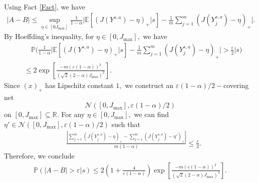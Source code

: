 \documentclass[12pt,technote,onecolumn]{IEEEtran}
\begin{document}
\begin{IEEEproof}
\begin{enumerate}
\begin{equation*}
\begin{aligned}
		\end{aligned}
		\end{equation*}
		Using Fact \ref{Fact}, we have
		\begin{equation*}
		\begin{aligned}
		\left|A-B\right|
		\leq\sup_{\eta\in\left[0J_{\max}\right]}\frac{1}{1-\alpha}\bigg|\mathbb{E}\left[\left(J\left(Y^{s,a}\right)-\eta\right)_{+}|s\right]
		-\frac{1}{m}\sum_{j=1}^{m}\left(J\left(Y_{j}^{s,a}\right)-\eta\right)_{+}\bigg|.
		\end{aligned}
		\end{equation*}
		By Hoeffding's inequality, for $\eta\in\left[0,J_{\max}\right],$
		we have	
		\begin{equation*}
		\begin{aligned}
			&\quad \mathbb{P}\bigg(\frac{1}{1-\alpha}\bigg|\mathbb{E}\left[\left(J\left(Y^{s,a}\right)-\eta\right)_{+}|s\right]
			-\frac{1}{m}\sum_{j=1}^{m}\left(J\left(Y_{j}^{s,a}\right)-\eta\right)_{+}\bigg|>\frac{\varepsilon}{2}|s\bigg)\\
			& \leq  2\exp\left[\frac{-m\left(\varepsilon\left(1-\alpha\right)\right)^{2}}{\left(\sqrt{2}\left(2-\alpha\right)J_{\max}\right)^{2}}\right].
		\end{aligned}
		\end{equation*}
		Since $\left(x\right)_{+}$ has Lipschitz constant $1,$ we construct
		an $\varepsilon\left(1-\alpha\right)/2-$covering net $$\mathcal{N}\left(\left[0,J_{\max}\right],\varepsilon\left(1-\alpha\right)/2\right)$$
		on $\left[0,J_{\max}\right]\subseteq\mathbb{R}$. For any $\eta\in\left[0,J_{\max}\right],$
		we can find $\eta'\in\mathcal{N}\left(\left[0,J_{\max}\right],\varepsilon\left(1-\alpha\right)/2\right)$
		such that
		\begin{equation*}
		\begin{aligned}
		\quad\frac{\left|\sum_{j=1}^{m}\left(J\left(Y_{j}^{s,a}\right)-\eta\right)_{+}-\sum_{j=1}^{m}\left(J\left(Y_{j}^{s,a}\right)-\eta'\right)_{+}\right|}{m\left(1-\alpha\right)}
		\leq\frac{\varepsilon}{2}.
		\end{aligned}
		\end{equation*}
		Therefore, we conclude
		\begin{equation*}
		\begin{aligned}
		\mathbb{P}\left(\left|A-B\right|>\varepsilon|s\right)
		\leq2\left(1+\frac{4}{\varepsilon\left(1-\alpha\right)}\right)\exp\left[\frac{-m\left(\varepsilon\left(1-\alpha\right)\right)^{2}}{\left(\sqrt{2}\left(2-\alpha\right)J_{\max}\right)^{2}}\right].
		\end{aligned}
		\end{equation*}
	\end{enumerate}
\end{IEEEproof}
\end{document}
